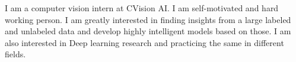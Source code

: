 

\begin{cvparagraph}

 I am a computer vision intern at CVision AI. I am self-motivated and hard working person. I am greatly interested in finding insights from a large labeled and unlabeled data and develop highly intelligent models based on those. I am also interested in Deep learning research and practicing the same in different fields.  
\end{cvparagraph}
